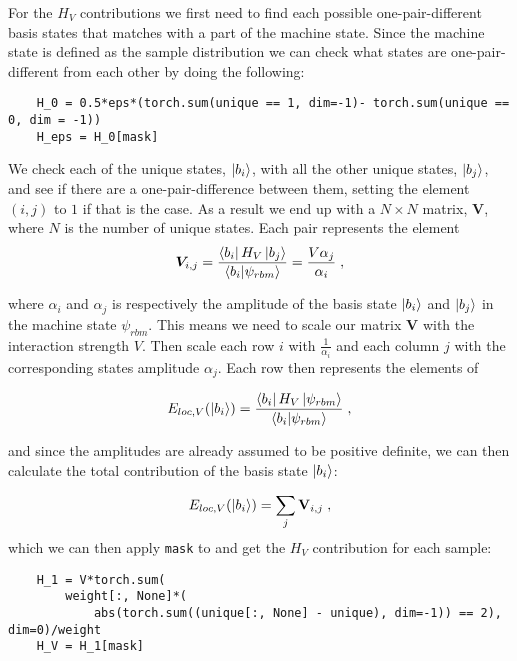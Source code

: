 For the $H_V$ contributions we first need to find each possible one-pair-different basis states that matches with a part of the machine state. Since the machine state is defined as the sample distribution we can check what states are one-pair-different from each other by doing the following:

\begin{verbatim} 
    H_0 = 0.5*eps*(torch.sum(unique == 1, dim=-1)- torch.sum(unique == 0, dim = -1))
    H_eps = H_0[mask]
\end{verbatim}

We check each of the unique states, $\ket{b_i}$, with all the other unique states, $\ket{b_j}$, and see if there are a one-pair-difference between them, setting the element $\left (i, j \right )$ to $1$ if that is the case. As a result we end up with a $N\times N$ matrix, $\mathbf{V}$, where $N$ is the number of unique states. Each pair represents the element
\begin{equation}
  \boldsymbol{V}_{i,j} =\frac{\bra{b_i}H_V\ket{b_j}}{\braket{b_i}{\psi_{rbm}}} = \frac{V\alpha_j}{\alpha_i} \; ,
  \label{eq:LMG_imp_V_cont}
\end{equation}

where $\alpha_i$ and $\alpha_j$ is respectively the amplitude of the basis state $\ket{b_i}$ and $\ket{b_j}$ in the machine state $\psi_{rbm}$. This means we need to scale our matrix $\mathbf{V}$ with the interaction strength $V$. Then scale each row $i$ with $\frac{1}{\alpha_i}$ and each column $j$ with the corresponding states amplitude $\alpha_j$. Each row then represents the elements of 

$$ E_{loc, V}(\ket{b_i}) = \frac{\bra{b_i}H_V\ket{\psi_{rbm}}}{\braket{b_i}{\psi_{rbm}}} \; , $$

and since the amplitudes are already assumed to be positive definite, we can then calculate the total contribution of the basis state $\ket{b_i}$:

\begin{equation}
 E_{loc, V}(\ket{b_i})= \sum_j \mathbf{V}_{i,j} \; ,
\end{equation}
which we can then apply \texttt{mask} to and get the $H_V$ contribution for each sample:

\begin{verbatim}
    H_1 = V*torch.sum(
        weight[:, None]*(
            abs(torch.sum((unique[:, None] - unique), dim=-1)) == 2), dim=0)/weight
    H_V = H_1[mask]
\end{verbatim}

